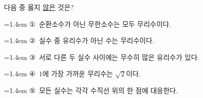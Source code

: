 다음 중 옳지 \underline{않은} 것은?
\par\medskip\par\noindent\hangindent=1.4em {\small ①}\ 순환소수가 아닌 무한소수는 모두 무리수이다.\par\noindent\hangindent=1.4em {\small ②}\ 실수 중 유리수가 아닌 수는 무리수이다.\par\noindent\hangindent=1.4em {\small ③}\ 서로 다른 두 실수 사이에는 무수히 많은 유리수가 있다.\par\noindent\hangindent=1.4em {\small ④}\ $1$에 가장 가까운 무리수는 $\sqrt{2}$이다.\par\noindent\hangindent=1.4em {\small ⑤}\ 모든 실수는 각각 수직선 위의 한 점에 대응한다.\par\medskip
